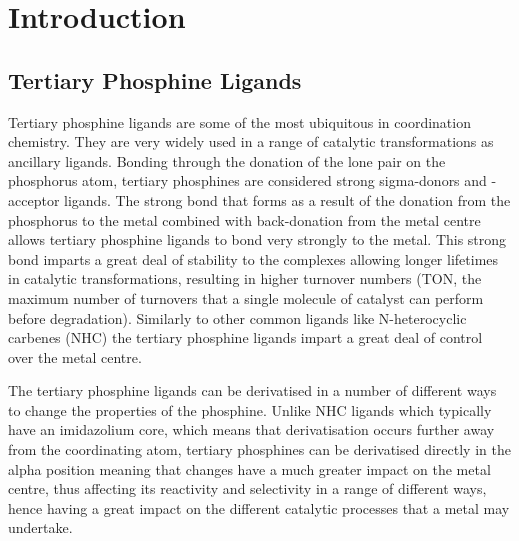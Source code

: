 
\chapter{Introduction}
\label{chapter:introduction}

\section{Tertiary Phosphine Ligands}

Tertiary phosphine ligands are some of the most ubiquitous in coordination chemistry.  They are very widely used in a range of catalytic transformations as ancillary ligands.  Bonding through the donation of the lone pair on the phosphorus atom, tertiary phosphines are considered strong sigma-donors and -acceptor ligands.  The strong bond that forms as a result of the donation from the phosphorus to the metal combined with back-donation from the metal centre  allows tertiary phosphine ligands to bond very strongly to the metal.  This strong bond imparts a great deal of stability to the complexes allowing longer lifetimes in catalytic transformations, resulting in higher turnover numbers (TON, the maximum number of turnovers that a single molecule of catalyst can perform before degradation).  Similarly to other common ligands like N-heterocyclic carbenes (NHC) the tertiary phosphine ligands impart a great deal of control over the metal centre.

The tertiary phosphine ligands can be derivatised in a number of different ways to change the properties of the phosphine.  Unlike NHC ligands which typically have an imidazolium core, which means that derivatisation occurs further away from the coordinating atom, tertiary phosphines can be derivatised directly in the alpha position meaning that changes have a much greater impact on the metal centre, thus affecting its reactivity and selectivity in a range of different ways, hence having a great impact on the different catalytic processes that a metal may undertake.

